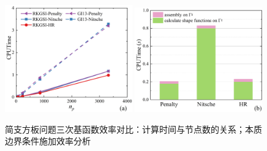 \begin{figure}[H]
    \centering
    \begin{subcaptiongroup}
    \includegraphics[width=0.49\textwidth]{figure/PHR/R/Ccputime.png}
    \label{Ccputime}
    \includegraphics[width=0.49\textwidth]{figure/PHR/R/Cefficiency.png}
    \label{Cefficiency}
    \end{subcaptiongroup}
\caption{简支方板问题三次基函数效率对比：计算时间与节点数的关系；本质边界条件施加效率分析}
\label{RCcputime}
\end{figure}
\newpage
